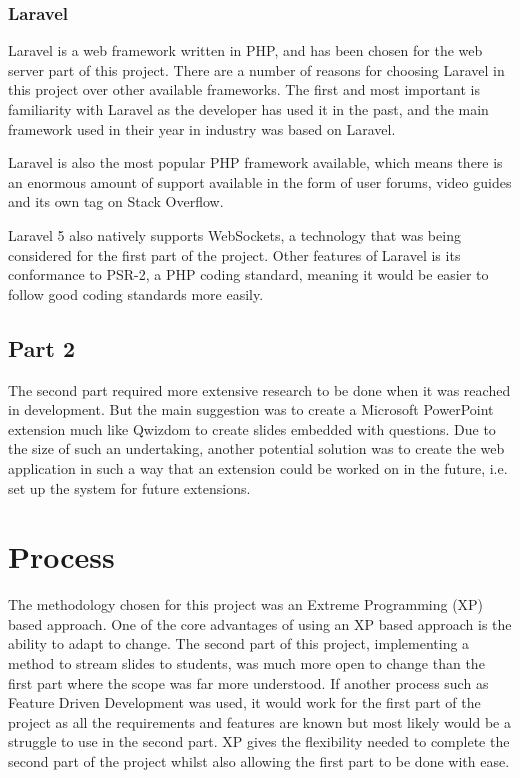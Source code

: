 \subsubsection{Laravel}
Laravel is a web framework written in PHP, and has been chosen for the web server part of this project\cite{laravel}. There are a number of reasons for choosing Laravel in this project over other available frameworks. The first and most important is familiarity with Laravel as the developer has used it in the past, and the main framework used in their year in industry was based on Laravel.

Laravel is also the most popular PHP framework available\cite{PopularPHPFrameworks}, which means there is an enormous amount of support available in the form of user forums, video guides and its own tag on Stack Overflow.

Laravel 5 also natively supports WebSockets, a technology that was being considered for the first part of the project. Other features of Laravel is its conformance to PSR-2, a PHP coding standard, meaning it would be easier to follow good coding standards more easily.
\subsection{Part 2}
The second part required more extensive research to be done when it was reached in development. But the main suggestion was to create a Microsoft PowerPoint extension much like Qwizdom to create slides embedded with questions\cite{powerpoint-addins}. Due to the size of such an undertaking, another potential solution was to create the web application in such a way that an extension could be worked on in the future, i.e. set up the system for future extensions.
\newpage

\section{Process}
The methodology chosen for this project was an Extreme Programming (XP) based approach. One of the core advantages of using an XP based approach is the ability to adapt to change. The second part of this project, implementing a method to stream slides to students, was much more open to change than the first part where the scope was far more understood. If another process such as Feature Driven Development was used, it would work for the first part of the project as all the requirements and features are known but most likely would be a struggle to use in the second part. XP gives the flexibility needed to complete the second part of the project whilst also allowing the first part to be done with ease.

